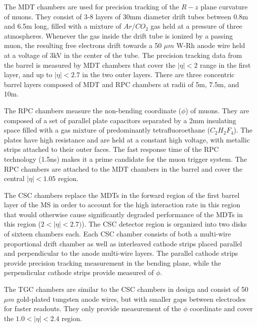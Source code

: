The MDT chambers are used for precision tracking of the $R-z$ plane curvature of muons.
They consist of 3-8 layers of 30mm diameter drift tubes between 0.8m and 6.5m long, filled with a mixture of $Ar/CO_2$ gas held at a pressure of three atmospheres.
Whenever the gas inside the drift tube is ionized by a passing muon, the resulting free electrons drift towards a 50 $\mu m$ W-Rh anode wire held at a voltage of 3kV in the center of the tube.
The precision tracking data from the barrel is measured by MDT chambers that cover the $|\eta| < 2$ range in the first layer, and up to $|\eta| < 2.7$ in the two outer layers.
There are three concentric barrel layers composed of MDT and RPC chambers at radii of 5m, 7.5m, and 10m.

The RPC chambers measure the non-bending coordinate ($\phi$) of muons.
They are composed of a set of parallel plate capacitors separated by a 2mm insulating space filled with a gas mixture of predominantly tetrafluoroethane ($C_2 H_2 F_4$). 
The plates have high resistance and are held at a constant high voltage, with metallic strips attached to their outer faces.
The fast response time of the RPC technology (1.5ns) makes it a prime candidate for the muon trigger system.
The RPC chambers are attached to the MDT chambers in the barrel and cover the central $|\eta| < 1.05$ region.

The CSC chambers replace the MDTs in the forward region of the first barrel layer of the MS in order to account for the high interaction rate in this region that would otherwise cause significantly degraded performance of the MDTs in this region ($2 < |\eta| < 2.7)$).
The CSC detector region is organized into two disks of sixteen chambers each.
Each CSC chamber consists of both a multi-wire proportional drift chamber as well as interleaved cathode strips placed parallel and perpendicular to the anode multi-wire layers.
The parallel cathode strips provide precision tracking measurement in the bending plane, while the perpendicular cathode strips provide measured of $\phi$.

The TGC chambers are similar to the CSC chambers in design and consist of 50 $\mu m$ gold-plated tungsten anode wires, but with smaller gaps between electrodes for faster readouts.
They only provide measurement of the $\phi$ coordinate and cover the $1.0 < |\eta| < 2.4$ region.

